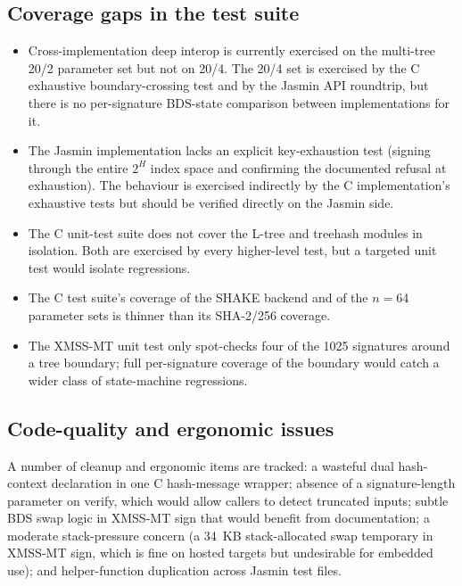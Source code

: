 \documentclass[11pt,a4paper]{article}
\begin{document}
\subsection{Coverage gaps in the test suite}

\begin{itemize}[nosep]
  \item Cross-implementation deep interop is currently exercised on
    the multi-tree 20/2 parameter set but not on 20/4. The 20/4
    set is exercised by the C exhaustive boundary-crossing test
    and by the Jasmin API roundtrip, but there is no per-signature
    BDS-state comparison between implementations for it.
  \item The Jasmin implementation lacks an explicit key-exhaustion
    test (signing through the entire $2^H$ index space and
    confirming the documented refusal at exhaustion). The behaviour
    is exercised indirectly by the C implementation's exhaustive
    tests but should be verified directly on the Jasmin side.
  \item The C unit-test suite does not cover the L-tree and treehash
    modules in isolation. Both are exercised by every higher-level
    test, but a targeted unit test would isolate regressions.
  \item The C test suite's coverage of the SHAKE backend and of the
    $n=64$ parameter sets is thinner than its SHA-2/256 coverage.
  \item The XMSS-MT unit test only spot-checks four of the 1025
    signatures around a tree boundary; full per-signature coverage
    of the boundary would catch a wider class of state-machine
    regressions.
\end{itemize}

\subsection{Code-quality and ergonomic issues}

A number of cleanup and ergonomic items are tracked: a wasteful dual
hash-context declaration in one C hash-message wrapper; absence of
a signature-length parameter on verify, which would allow callers to
detect truncated inputs; subtle BDS swap logic in XMSS-MT
sign that would benefit from documentation; a moderate stack-pressure
concern (a 34~KB stack-allocated swap temporary in XMSS-MT sign,
which is fine on hosted targets but undesirable for embedded use);
and helper-function duplication across Jasmin test files.
\end{document}
